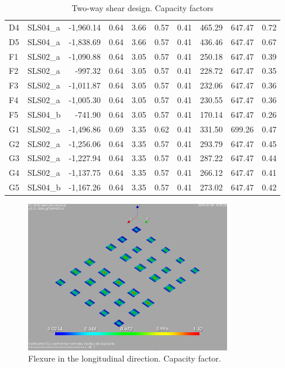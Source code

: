 \begin{table}
\begin{center}
\begin{scriptsize}
\begin{tabular}{|l|l|r|r|r|r|r|r|r|r|}
 D4 &  SLS04\_a & -1,960.14 & 0.64 & 3.66 & 0.57 & 0.41 & 465.29 & 647.47 & 0.72\\
 D5 &  SLS04\_a & -1,838.69 & 0.64 & 3.66 & 0.57 & 0.41 & 436.46 & 647.47 & 0.67\\
 F1 &  SLS02\_a & -1,090.88 & 0.64 & 3.05 & 0.57 & 0.41 & 250.18 & 647.47 & 0.39\\
 F2 &  SLS02\_a & -997.32 & 0.64 & 3.05 & 0.57 & 0.41 & 228.72 & 647.47 & 0.35\\
 F3 &  SLS02\_a & -1,011.87 & 0.64 & 3.05 & 0.57 & 0.41 & 232.06 & 647.47 & 0.36\\
 F4 &  SLS02\_a & -1,005.30 & 0.64 & 3.05 & 0.57 & 0.41 & 230.55 & 647.47 & 0.36\\
 F5 &  SLS04\_b & -741.90 & 0.64 & 3.05 & 0.57 & 0.41 & 170.14 & 647.47 & 0.26\\
 G1 &  SLS02\_a & -1,496.86 & 0.69 & 3.35 & 0.62 & 0.41 & 331.50 & 699.26 & 0.47\\
 G2 &  SLS02\_a & -1,256.06 & 0.64 & 3.35 & 0.57 & 0.41 & 293.79 & 647.47 & 0.45\\
 G3 &  SLS02\_a & -1,227.94 & 0.64 & 3.35 & 0.57 & 0.41 & 287.22 & 647.47 & 0.44\\
 G4 &  SLS02\_a & -1,137.75 & 0.64 & 3.35 & 0.57 & 0.41 & 266.12 & 647.47 & 0.41\\
 G5 &  SLS04\_b & -1,167.26 & 0.64 & 3.35 & 0.57 & 0.41 & 273.02 & 647.47 & 0.42\\
\hline
  \end{tabular}
  \end{scriptsize}
  \end{center}
\caption{Two-way shear design. Capacity factors}\label{tb_footings_puching_design}
\end{table}

\begin{figure}
  \begin{center}
    \includegraphics[width=90mm]{figures/flexure_design_cf_long_direction}
  \end{center}
    \caption{Flexure in the longitudinal direction. Capacity factor.}\label{fg_flexure_design_cf_long_direction}
\end{figure}

